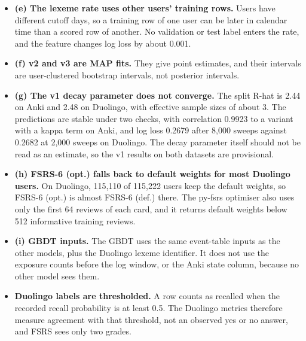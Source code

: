 \begin{itemize}
\item \textbf{(e) The lexeme rate uses other users' training rows.} Users have different cutoff days, so a training row of one user can be later in calendar time than a scored row of another. No validation or test label enters the rate, and the feature changes log loss by about 0.001.
\item \textbf{(f) v2 and v3 are MAP fits.} They give point estimates, and their intervals are user-clustered bootstrap intervals, not posterior intervals.
\item \textbf{(g) The v1 decay parameter does not converge.} The split R-hat is 2.44 on Anki and 2.48 on Duolingo, with effective sample sizes of about 3. The predictions are stable under two checks, with correlation 0.9923 to a variant with a kappa term on Anki, and log loss 0.2679 after 8,000 sweeps against 0.2682 at 2,000 sweeps on Duolingo. The decay parameter itself should not be read as an estimate, so the v1 results on both datasets are provisional.
\item \textbf{(h) FSRS-6 (opt.) falls back to default weights for most Duolingo users.} On Duolingo, 115,110 of 115,222 users keep the default weights, so FSRS-6 (opt.) is almost FSRS-6 (def.) there. The py-fsrs optimiser also uses only the first 64 reviews of each card, and it returns default weights below 512 informative training reviews.
\item \textbf{(i) GBDT inputs.} The GBDT uses the same event-table inputs as the other models, plus the Duolingo lexeme identifier. It does not use the exposure counts before the log window, or the Anki state column, because no other model sees them.
\item \textbf{Duolingo labels are thresholded.} A row counts as recalled when the recorded recall probability is at least 0.5. The Duolingo metrics therefore measure agreement with that threshold, not an observed yes or no answer, and FSRS sees only two grades.

\end{itemize}
